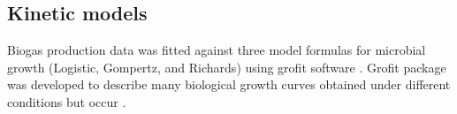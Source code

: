 \subsection{Kinetic models}
Biogas production data was fitted against three model formulas for microbial growth (Logistic, Gompertz, and Richards) using grofit software \cite{Kahm_2010}. Grofit package was developed to describe many biological growth curves obtained under different conditions but 
occur \cite{Kahm_2010}.